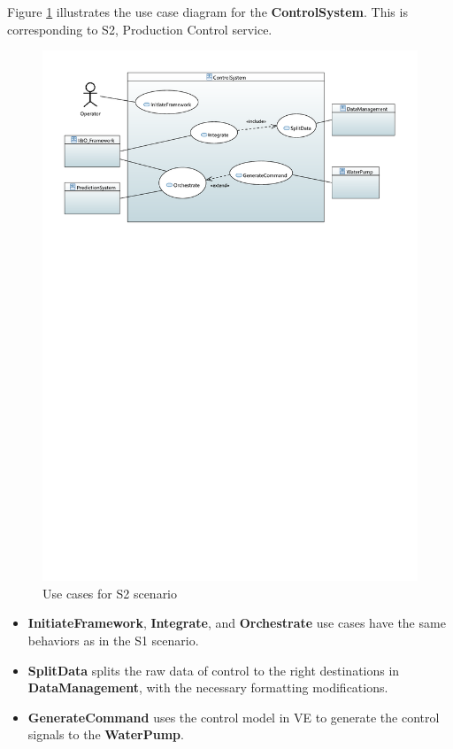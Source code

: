 Figure \ref{fig:usecase2} illustrates the use case diagram for the \textbf{ControlSystem}. This is corresponding to S2, Production Control service.

\begin{figure}[hbt!]
  \centering
  \includegraphics[scale=0.75]{figures/usecase2.pdf}
  \caption{Use cases for S2 scenario}
  \label{fig:usecase2}
\end{figure}

\begin{itemize}
\item \textbf{InitiateFramework}, \textbf{Integrate}, and \textbf{Orchestrate} use cases have the same behaviors as in the S1 scenario.

\item \textbf{SplitData} splits the raw data of control to the right destinations in \textbf{DataManagement}, with the necessary formatting modifications.

\item \textbf{GenerateCommand} uses the control model in VE to generate the control signals to the \textbf{WaterPump}.
\end{itemize}


